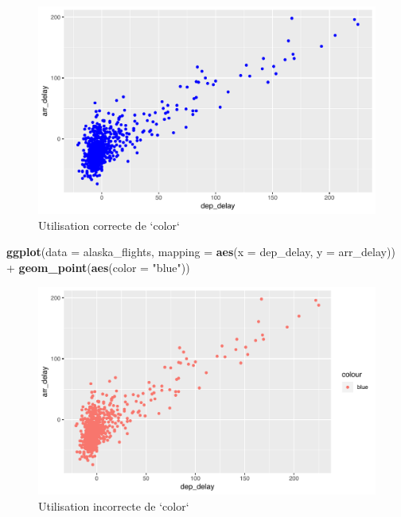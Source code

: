 \documentclass[a4paperpaper,]{article}
\newenvironment{Shaded}{\begin{snugshade}}{\end{snugshade}}
\newcommand{\DataTypeTok}[1]{\textcolor[rgb]{0.00,0.34,0.68}{#1}}
\newcommand{\KeywordTok}[1]{\textcolor[rgb]{0.12,0.11,0.11}{\textbf{#1}}}
\newcommand{\NormalTok}[1]{\textcolor[rgb]{0.12,0.11,0.11}{#1}}
\newcommand{\OperatorTok}[1]{\textcolor[rgb]{0.12,0.11,0.11}{#1}}
\newcommand{\StringTok}[1]{\textcolor[rgb]{0.75,0.01,0.01}{#1}}
\theoremstyle{definition}
\theoremstyle{definition}
\theoremstyle{definition}
\theoremstyle{remark}
\begin{document}
\begin{figure}[htpb]

{\centering \includegraphics[width=0.9\linewidth]{figure/rightcolor-1} 

}

\caption{Utilisation correcte de `color`}\label{fig:rightcolor}
\end{figure}

\begin{Shaded}
\begin{Highlighting}[]
\KeywordTok{ggplot}\NormalTok{(}\DataTypeTok{data =}\NormalTok{ alaska_flights, }\DataTypeTok{mapping =} \KeywordTok{aes}\NormalTok{(}\DataTypeTok{x =}\NormalTok{ dep_delay, }\DataTypeTok{y =}\NormalTok{ arr_delay)) }\OperatorTok{+}
\StringTok{  }\KeywordTok{geom_point}\NormalTok{(}\KeywordTok{aes}\NormalTok{(}\DataTypeTok{color =} \StringTok{"blue"}\NormalTok{))}
\end{Highlighting}
\end{Shaded}

\begin{figure}[htpb]

{\centering \includegraphics[width=0.9\linewidth]{figure/wrongcolor-1} 

}

\caption{Utilisation incorrecte de `color`}\label{fig:wrongcolor}
\end{figure}
\end{document}
